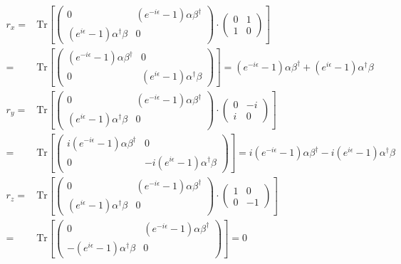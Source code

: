 \begin{equation}
\begin{split}
  r_{x} = &  \text{Tr} \left[ \begin{pmatrix}
0 & (e^{-i\epsilon}-1) \alpha \beta^{\dag} \\
(e^{i\epsilon}-1) \alpha^{\dag} \beta  & 0
\end{pmatrix} \cdot \begin{pmatrix}
0&1\\
1&0
\end{pmatrix} \right]  \\
= & \text{Tr} \left[ \begin{pmatrix}
  (e^{-i\epsilon}-1) \alpha \beta^{\dag}  & 0\\
0 &  (e^{i\epsilon}-1) \alpha^{\dag} \beta
\end{pmatrix} \right] = (e^{-i\epsilon}-1) \alpha \beta^{\dag}  + (e^{i\epsilon}-1) \alpha^{\dag} \beta \\
r_{y} = &  \text{Tr} \left[ \begin{pmatrix}
  0 & (e^{-i\epsilon}-1) \alpha \beta^{\dag} \\
  (e^{i\epsilon}-1) \alpha^{\dag} \beta  & 0
  \end{pmatrix} \cdot \begin{pmatrix}
  0&-i\\
  i&0
  \end{pmatrix} \right]  \\
  = & \text{Tr} \left[ \begin{pmatrix}
    i(e^{-i\epsilon}-1) \alpha \beta^{\dag}  & 0\\
  0 &  -i(e^{i\epsilon}-1) \alpha^{\dag} \beta
  \end{pmatrix} \right] = i(e^{-i\epsilon}-1) \alpha \beta^{\dag}  - i(e^{i\epsilon}-1) \alpha^{\dag} \beta \\
  r_{z} = &  \text{Tr} \left[ \begin{pmatrix}
  0 & (e^{-i\epsilon}-1) \alpha \beta^{\dag} \\
  (e^{i\epsilon}-1) \alpha^{\dag} \beta  & 0
  \end{pmatrix} \cdot \begin{pmatrix}
  1&0\\
  0&-1
  \end{pmatrix} \right]  \\
  = & \text{Tr} \left[ \begin{pmatrix}
    0&(e^{-i\epsilon}-1) \alpha \beta^{\dag} \\
    -(e^{i\epsilon}-1) \alpha^{\dag} \beta  & 0
  \end{pmatrix} \right] = 0 \\
\end{split}
\end{equation}

